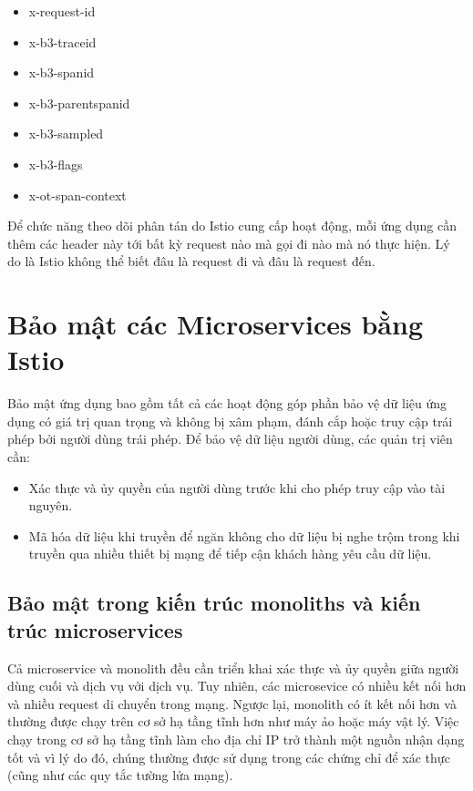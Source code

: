 \documentclass[12pt,a4paper]{report}
\begin{document}
{{		\begin{itemize}				
			\item x-request-id
			\item x-b3-traceid
			\item x-b3-spanid
			\item x-b3-parentspanid
			\item x-b3-sampled
			\item x-b3-flags
			\item x-ot-span-context
		\end{itemize}
		
		Để chức năng theo dõi phân tán do Istio cung cấp hoạt động, mỗi ứng dụng cần thêm các header này tới bất kỳ request nào mà gọi đi nào mà nó thực hiện. Lý do là Istio không thể biết đâu là request đi và đâu là request đến.
		
	\section{Bảo mật các Microservices bằng Istio}
		{\hspace{0.6cm}Bảo mật ứng dụng bao gồm tất cả các hoạt động góp phần bảo vệ dữ liệu ứng dụng có giá trị quan trọng và không bị xâm phạm, đánh cắp hoặc truy cập trái phép bởi người dùng trái phép. Để bảo vệ dữ liệu người dùng, các quản trị viên cần:}
		\begin{itemize}
			\item Xác thực và ủy quyền của người dùng trước khi cho phép truy cập vào tài nguyên.
			\item Mã hóa dữ liệu khi truyền để ngăn không cho dữ liệu bị nghe trộm trong khi truyền qua nhiều thiết bị mạng để tiếp cận khách hàng yêu cầu dữ liệu.
		\end{itemize}
		
		\subsection{Bảo mật trong kiến trúc monoliths và kiến trúc microservices}
			{\hspace{0.6cm}Cả microservice và monolith đều cần triển khai xác thực và ủy quyền giữa người dùng cuối và dịch vụ với dịch vụ. Tuy nhiên, các microsevice có nhiều kết nối hơn và nhiều request di chuyển trong mạng. Ngược lại, monolith có ít kết nối hơn và thường được chạy trên cơ sở hạ tầng tĩnh hơn như máy ảo hoặc máy vật lý. Việc chạy trong cơ sở hạ tầng tĩnh làm cho địa chỉ IP trở thành một nguồn nhận dạng tốt và vì lý do đó, chúng thường được sử dụng trong các chứng chỉ để xác thực (cũng như các quy tắc tường lửa mạng).}
			
}}
\end{document}
